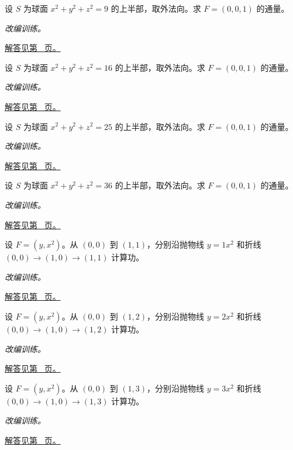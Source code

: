 \documentclass[12pt,fontset=fandol]{ctexart}
\begin{document}
\begin{example}[上半球上的常向量通量]\label{ex:c42q15}
设 $S$ 为球面 $x^2+y^2+z^2=9$ 的上半部，取外法向。求 $F=(0,0,1)$ 的通量。
\par\textit{改编训练。}\par\hyperref[ans:c42q15]{解答见第~\pageref{ans:c42q15} 页。}
\end{example}
\begin{example}[上半球上的常向量通量]\label{ex:c42q16}
设 $S$ 为球面 $x^2+y^2+z^2=16$ 的上半部，取外法向。求 $F=(0,0,1)$ 的通量。
\par\textit{改编训练。}\par\hyperref[ans:c42q16]{解答见第~\pageref{ans:c42q16} 页。}
\end{example}
\begin{example}[上半球上的常向量通量]\label{ex:c42q17}
设 $S$ 为球面 $x^2+y^2+z^2=25$ 的上半部，取外法向。求 $F=(0,0,1)$ 的通量。
\par\textit{改编训练。}\par\hyperref[ans:c42q17]{解答见第~\pageref{ans:c42q17} 页。}
\end{example}
\begin{example}[上半球上的常向量通量]\label{ex:c42q18}
设 $S$ 为球面 $x^2+y^2+z^2=36$ 的上半部，取外法向。求 $F=(0,0,1)$ 的通量。
\par\textit{改编训练。}\par\hyperref[ans:c42q18]{解答见第~\pageref{ans:c42q18} 页。}
\end{example}
\begin{example}[两条路径给出不同功]\label{ex:c42q19}
设 $F=(y,x^2)$。从 $(0,0)$ 到 $(1,1)$，分别沿抛物线 $y=1x^2$ 和折线 $(0,0)\to(1,0)\to(1,1)$ 计算功。
\par\textit{改编训练。}\par\hyperref[ans:c42q19]{解答见第~\pageref{ans:c42q19} 页。}
\end{example}
\begin{example}[两条路径给出不同功]\label{ex:c42q20}
设 $F=(y,x^2)$。从 $(0,0)$ 到 $(1,2)$，分别沿抛物线 $y=2x^2$ 和折线 $(0,0)\to(1,0)\to(1,2)$ 计算功。
\par\textit{改编训练。}\par\hyperref[ans:c42q20]{解答见第~\pageref{ans:c42q20} 页。}
\end{example}
\begin{example}[两条路径给出不同功]\label{ex:c42q21}
设 $F=(y,x^2)$。从 $(0,0)$ 到 $(1,3)$，分别沿抛物线 $y=3x^2$ 和折线 $(0,0)\to(1,0)\to(1,3)$ 计算功。
\par\textit{改编训练。}\par\hyperref[ans:c42q21]{解答见第~\pageref{ans:c42q21} 页。}
\end{example}
\end{document}
